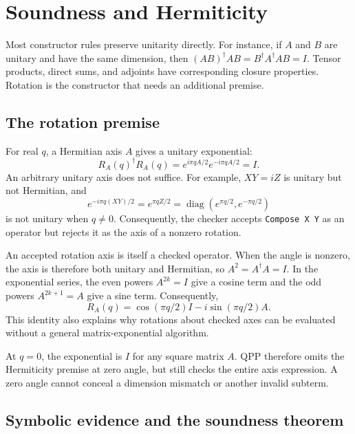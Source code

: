 \documentclass[11pt,a4paper]{article}
\newcommand{\code}[1]{\texttt{#1}}
\newcommand{\rot}[2]{R_{#1}(#2)}
\DeclareMathOperator{\diag}{diag}
\begin{document}
\clearpage
\section{Soundness and Hermiticity}

Most constructor rules preserve unitarity directly. For instance, if
$A$ and $B$ are unitary and have the same dimension, then
$(AB)^\dagger AB=B^\dagger A^\dagger AB=I$.
Tensor products, direct sums, and adjoints have corresponding closure
properties. Rotation is the constructor that needs an additional premise.

\subsection{The rotation premise}

For real $q$, a Hermitian axis $A$ gives a unitary exponential:
\begin{equation}
  \rot Aq^\dagger\rot Aq
    =e^{i\pi qA/2}e^{-i\pi qA/2}=I.
  \label{eq:rotation-unitary}
\end{equation}
An arbitrary unitary axis does not suffice. For example, $XY=iZ$ is
unitary but not Hermitian, and
\[
  e^{-i\pi q(XY)/2}=e^{\pi qZ/2}
    =\diag(e^{\pi q/2},e^{-\pi q/2})
\]
is not unitary when $q\ne0$. Consequently, the checker accepts
\code{Compose X Y} as an operator but rejects it as the axis of a
nonzero rotation.

An accepted rotation axis is itself a checked operator. When the angle
is nonzero, the axis is therefore both unitary and Hermitian, so
$A^2=A^\dagger A=I$. In the exponential series, the even powers
$A^{2k}=I$ give a cosine term and the odd powers $A^{2k+1}=A$ give
a sine term. Consequently,
\begin{equation}
  \rot Aq=\cos(\pi q/2)I-i\sin(\pi q/2)A.
  \label{eq:involution-rotation}
\end{equation}
This identity also explains why rotations about checked axes can be
evaluated without a general matrix-exponential algorithm.

At $q=0$, the exponential is $I$ for any square matrix $A$. QPP therefore
omits the Hermiticity premise at zero angle, but still checks the entire
axis expression. A zero angle cannot conceal a dimension mismatch or
another invalid subterm.

\subsection{Symbolic evidence and the soundness theorem}
\end{document}
